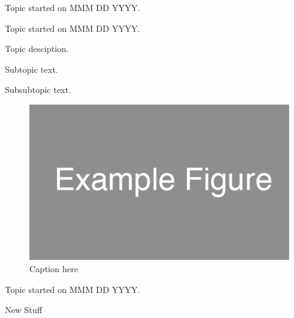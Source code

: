 \documentclass[hyperref]{ROLatex/notebook}
\begin{document}

\frontmatter %

\date{Month DD, YYYY}

\maketitle
\tableofcontents

\mainmatter %


\label{sec:topic}
Topic started on MMM DD YYYY.

Topic started on MMM DD YYYY.

Topic desciption.


Subtopic text.


Subsubtopic text.

\begin{figure}[]
  \centering
  \includegraphics[width=.5\textwidth]{Figs/example_figure.png}
  \caption{Caption here}
  \label{fig:1}
\end{figure}


\label{sec:next_topic}
Topic started on MMM DD YYYY.

New Stuff
\end{document}
